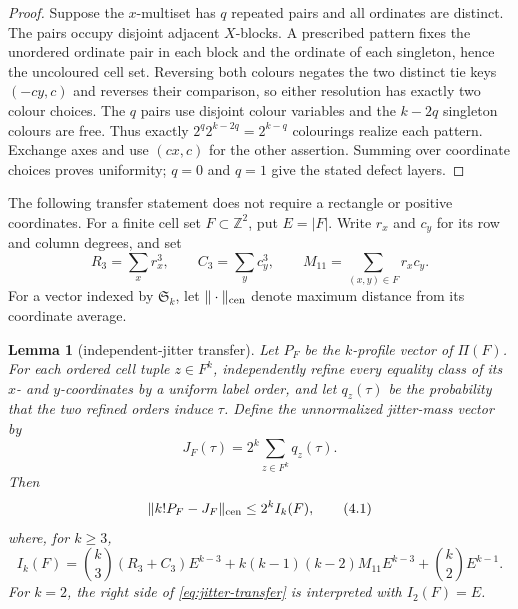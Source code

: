 \documentclass[11pt,letterpaper]{article}
\newtheorem{lemma}[theorem]{Lemma}
\newcommand{\Ssym}{\mathfrak S}
\begin{document}
\begin{proof}
Suppose the $x$-multiset has $q$ repeated pairs and all ordinates are
distinct.  The pairs occupy disjoint adjacent $X$-blocks.  A prescribed
pattern fixes the unordered ordinate pair in each block and the ordinate
of each singleton, hence the uncoloured cell set.  Reversing both colours
negates the two distinct tie keys $(-cy,c)$ and reverses their comparison,
so either resolution has exactly two colour choices.  The $q$ pairs use
disjoint colour variables and the $k-2q$ singleton colours are free.
Thus exactly $2^q2^{k-2q}=2^{k-q}$ colourings realize each pattern.
Exchange axes and use $(cx,c)$ for the other assertion.  Summing over
coordinate choices proves uniformity; $q=0$ and $q=1$ give the stated
defect layers.
\end{proof}

The following transfer statement does not require a rectangle or positive
coordinates.  For a finite cell set $F\subset\mathbb Z^2$, put $E=|F|$.  Write $r_x$ and $c_y$ for its
row and column degrees, and set
\[
 R_3=\sum_xr_x^3,\qquad C_3=\sum_yc_y^3,
 \qquad M_{11}=\sum_{(x,y)\in F}r_xc_y.
\]
For a vector indexed by $\Ssym_k$, let $\|\cdot\|_{\rm cen}$ denote
maximum distance from its coordinate average.

\begin{lemma}[independent-jitter transfer]\label{lem:jitter}
Let $P_F$ be the $k$-profile vector of $\Pi(F)$.  For each ordered
cell tuple $z\in F^k$, independently refine every equality class of its
$x$- and $y$-coordinates by a uniform label order, and let
$q_z(\tau)$ be the probability that the two refined orders induce
$\tau$.  Define the unnormalized jitter-mass vector by
\[
 J_F(\tau)=2^k\sum_{z\in F^k}q_z(\tau).
\]
Then
\[
 \|k!P_F-J_F\|_{\rm cen}\leq 2^k I_k(F),
 \tag{4.1}\label{eq:jitter-transfer}
\]
where, for $k\geq3$,
\[
 I_k(F)=\binom{k}{3}(R_3+C_3)E^{k-3}
 +k(k-1)(k-2)M_{11}E^{k-3}
 +\binom{k}{2}E^{k-1}.
 \tag{4.2}\label{eq:interaction-moment}
\]
For $k=2$, the right side of \eqref{eq:jitter-transfer} is interpreted
with $I_2(F)=E$.
\end{lemma}
\end{document}

